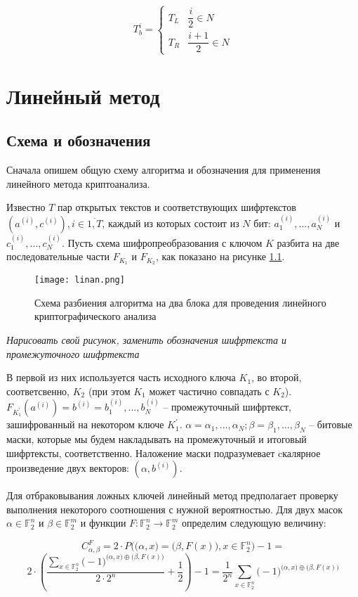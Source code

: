 \documentclass[utf8x, 14pt]{G7-32} %
\begin{document}
$$ T_b^i =
\begin{cases}
T_L & \dfrac{i}{2} \in N \\
T_R & \dfrac{i+1}{2} \in N
\end{cases} $$

\chapter{Линейный метод}
\section{Схема и обозначения}
Сначала опишем общую схему алгоритма и обозначения для применения линейного метода криптоанализа.

Известно $T$ пар открытых текстов и соответствующих шифртекстов $(a^{(i)}, c^{(i)}), i\in\overline{1,T}$, каждый из которых состоит из $N$ бит: $a_1^{(i)}, ..., a_N^{(i)}$ и $c_1^{(i)}, ..., c_N^{(i)}$. Пусть схема шифропреобразования с ключом $K$ разбита на две последовательные части $F_{K_1}$ и $F_{K_2}$, как показано на рисунке \ref{fig:linan}. 
\begin{figure}[h!]
	\centering
	\texttt{[image: linan.png]}
	\caption{Схема разбиения алгоритма на два блока для проведения линейного криптографического анализа}
	\label{fig:linan}
\end{figure}
\textit{Нарисовать свой рисунок, заменить обозначения шифртекста и промежуточного шифртекста}

В первой из них используется часть исходного ключа $K_1$, во второй, соответсвенно, $K_2$ (при этом $K_1$ может частично совпадать с $K_2$). $F_{K_1^{'}}(a^{(i)}) = b^{(i)} = b_1^{(i)}, ..., b_N^{(i)}$ -- промежуточный шифртекст, зашифрованный на некотором ключе $K_1^{'}$. $\alpha = \alpha_1, ..., \alpha_N; \beta = \beta_1, ..., \beta_N$ -- битовые маски, которые мы будем накладывать на промежуточный и итоговый шифртексты, соответственно. Наложение маски подразумевает cкалярное произведение двух векторов: $(\alpha, b^{(i)})$.

Для отбраковывания ложных ключей линейный метод предполагает проверку выполнения некоторого соотношения с нужной вероятностью. Для двух масок $\alpha \in \mathbb{F}_2^n$ и $\beta \in \mathbb{F}_2^m$ и функции $F :\mathbb{F}_2^n \to \mathbb{F}_2^m$ определим следующую величину:

$$ C_{\alpha, \beta}^{F} = 2\cdot P\Big( \big(\alpha, x\big) = \big(\beta, F(x)\big), x\in \mathbb{F}_2^n\Big) - 1 = $$
$$ 2\cdot \left(\dfrac{\sum_{x\in \mathbb{F}_2^n} \big(-1\big)^{\big(\alpha, x\big) \oplus \big(\beta, F(x)\big)}}{2 \cdot 2^n} + \dfrac{1}{2}\right)  - 1 = \dfrac{1}{2^n} \sum_{x\in \mathbb{F}_2^n} \big(-1\big)^{\big(\alpha, x\big) \oplus \big(\beta, F(x)\big)}$$
\end{document}
